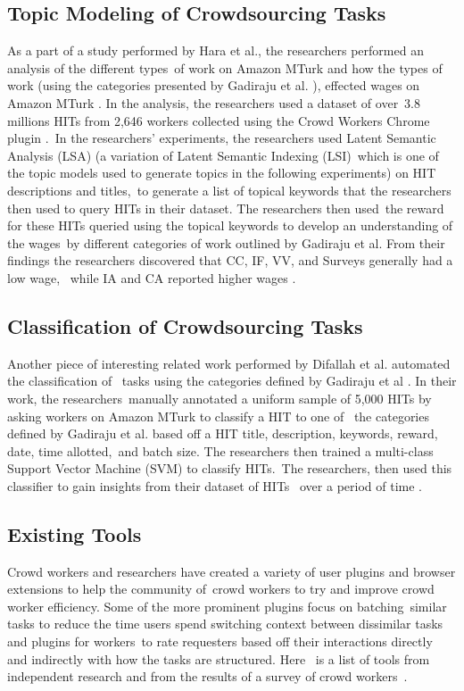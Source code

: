 \documentclass[letterpaper,12pt]{article}
\begin{document}
\subsection{Topic Modeling of Crowdsourcing Tasks}
As a part of a study performed by Hara et al., the researchers performed an analysis of the different types\
of work on Amazon MTurk and how the types of work (using the categories presented by Gadiraju et al. \cite{gadiraju2014taxonomy}),
effected wages on Amazon MTurk \cite{hara2018data}. In the analysis, the researchers used a dataset of over\
3.8 millions HITs from 2,646 workers collected using the Crowd Workers Chrome plugin \cite{hara2018data,callison2014crowd}.\
In the researchers' experiments, the researchers used Latent Semantic Analysis (LSA) (a variation of Latent Semantic Indexing (LSI)\
which is one of the topic models used to generate topics in the following experiments) on HIT descriptions and titles,\
to generate a list of topical keywords that the researchers then used to query HITs in their dataset. The researchers then used\
the reward for these HITs queried using the topical keywords to develop an understanding of the wages\
by different categories of work outlined by Gadiraju et al.
From their findings the researchers discovered that CC, IF, VV, and Surveys generally had a low wage, \
while IA and CA reported higher wages \cite{hara2018data}. 

\subsection{Classification of Crowdsourcing Tasks}
Another piece of interesting related work performed by Difallah et al. automated the classification of \
tasks using the categories defined by Gadiraju et al \cite{difallah2015dynamics}. In their work, the researchers\
manually annotated a uniform sample of 5,000 HITs by asking workers on Amazon MTurk to classify a HIT to one of \
the categories defined by Gadiraju et al. based off a HIT title, description, keywords, reward, date, time allotted,\
and batch size. The researchers then trained a multi-class Support Vector Machine (SVM) to classify HITs.\
The researchers, then used this classifier to gain insights from their dataset of HITs \
over a period of time \cite{difallah2015dynamics}. 

\subsection{Existing Tools}
Crowd workers and researchers have created a variety of user plugins and browser extensions to help the community of\
crowd workers to try and improve crowd worker efficiency. Some of the more prominent plugins focus on batching\
similar tasks to reduce the time users spend switching context between dissimilar tasks and plugins for workers\
to rate requesters based off their interactions directly and indirectly with how the tasks are structured. Here \
is a list of tools from independent research and from the results of a survey of crowd workers\
\cite{Kaplan2018}. 
\end{document}
